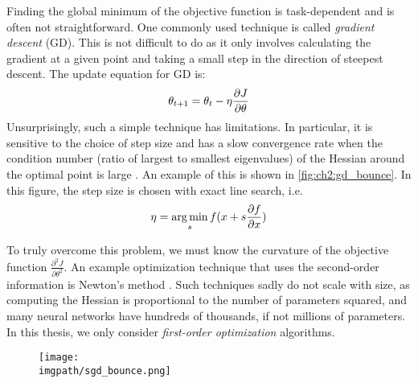   Finding the global minimum of the objective
  function is task-dependent and is often not straightforward. One commonly used
  technique is called \emph{gradient descent} (GD). This is not difficult to do as
  it only involves calculating the gradient at a given point and taking a small
  step in the direction of steepest descent. The update equation for GD is: 
  \begin{equation}\label{eq:ch2:gd}
    \theta_{t+1} = \theta_t - \eta \frac{\partial J}{\partial \theta}
  \end{equation}
  Unsurprisingly, such a simple technique has limitations. In particular, it
  is sensitive to the choice of step size and
  has a slow convergence rate when the condition number (ratio of largest to 
  smallest eigenvalues) of the Hessian around the optimal point is large
  \cite{boyd_convex_2004}. An example of this is shown in
  \autoref{fig:ch2:gd_bounce}. In this figure, the step size is chosen with
  exact line search, i.e.
  \begin{equation}\label{eq:ch2:search}
    \eta = \operatorname*{arg\,min}_s f(x + s \frac{\partial f}{\partial x})
  \end{equation}  
  
  To truly overcome this problem, we must know the curvature
  of the objective function $\frac{\partial^2 J}{\partial \theta^2}$. An example
  optimization technique that uses the second-order information is Newton's
  method \cite[Chapter~9]{boyd_convex_2004}. Such techniques sadly do not scale
  with size, as computing the Hessian is proportional to the number of
  parameters squared, and many neural networks have hundreds of thousands, if
  not millions of parameters. In this thesis, we only consider \emph{first-order
  optimization} algorithms.

  \begin{figure}[t]
  \centering
  \texttt{[image: \\imgpath/sgd\_bounce.png]}
  \label{fig:ch2:gd_bounce}
\end{figure}

